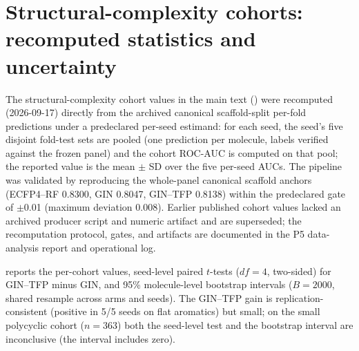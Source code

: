 \documentclass[11pt,a4paper]{article}
\begin{document}
\section{Structural-complexity cohorts: recomputed statistics and uncertainty}
\label{sec:cohort_stats_si}

The structural-complexity cohort values in the main text () were recomputed (2026-09-17) directly from the archived canonical scaffold-split per-fold predictions under a predeclared per-seed estimand: for each seed, the seed's five disjoint fold-test sets are pooled (one prediction per molecule, labels verified against the frozen panel) and the cohort ROC-AUC is computed on that pool; the reported value is the mean $\pm$ SD over the five per-seed AUCs. The pipeline was validated by reproducing the whole-panel canonical scaffold anchors (ECFP4--RF \num{0.8300}, GIN \num{0.8047}, GIN--TFP \num{0.8138}) within the predeclared gate of $\pm$\num{0.01} (maximum deviation \num{0.008}). Earlier published cohort values lacked an archived producer script and numeric artifact and are superseded; the recomputation protocol, gates, and artifacts are documented in the P5 data-analysis report and operational log.

 reports the per-cohort values, seed-level paired $t$-tests ($df=\num{4}$, two-sided) for GIN--TFP minus GIN, and 95\% molecule-level bootstrap intervals ($B=\num{2000}$, shared resample across arms and seeds). The GIN--TFP gain is replication-consistent (positive in 5/5 seeds on flat aromatics) but small; on the small polycyclic cohort ($n=\num{363}$) both the seed-level test and the bootstrap interval are inconclusive (the interval includes zero).

\begin{table}[h]
\centering
\caption{Recomputed structural-complexity cohorts (primary per-seed estimand) with seed-level paired $t$-tests and 95\% molecule-level bootstrap intervals for the GIN--TFP $-$ GIN contrast.}
\label{tab:s6_cohort_stats}
\end{table}
\end{document}

